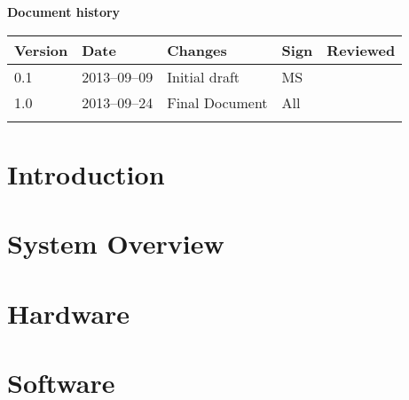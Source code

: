 \documentclass[10pt, a4paper, twoside]{article}
\numberwithin{equation}{subsection}
\numberwithin{figure}{section}
\numberwithin{table}{section}
\begin{document}



\newpage
\pagestyle{fancy}
\setcounter{page}{2} %



\newpage
\tableofcontents
\listoffigures


\newpage
\vspace*{5\baselineskip}

\begin{center}
\textbf{\LARGE Document history}

{ \footnotesize 
\begin{tabular}{|p{1cm}|p{2.0cm}|p{5cm}|p{1.5cm}|p{2cm}|}
	\hline
	\textbf{Version} & \textbf{Date} & \textbf{Changes} & \textbf{Sign} & \textbf{Reviewed} \\
	
	\hline
	0.1 & 2013--09--09 & Initial draft & MS & \\
	\hline
	1.0 & 2013--09--24 & Final Document & All & \\
	
	\hline
	 &  &  &  &  \\
	
	\hline
\end{tabular}
}
\end{center}



%
%
\newpage
{}


\newpage
\section{Introduction}
\label{sec:introduction}


\newpage
\section{System Overview}
\label{sec:system_overview}


\newpage
\section{Hardware}
\label{sec:hardware}


\newpage
\section{Software}
\label{sec:software}

\end{document}
